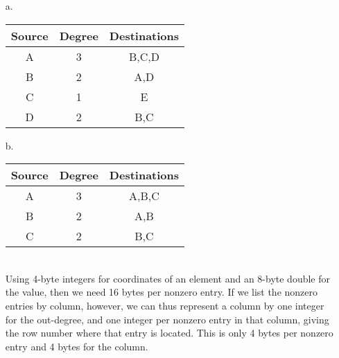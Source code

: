 \documentclass{article}
\begin{document}
\begin{itemize}
\begin{itemize}
			\begin{itemize}
				\item[a.]
					\begin{tabular}{c c c}
			 			\textbf{Source} & \textbf{Degree} & \textbf{Destinations}\\
						\hline
						A & 3 & B,C,D \\
						B & 2 & A,D \\
						C & 1 & E \\
						D & 2 & B,C \\
					\end{tabular}
				\item[b.]
					\begin{tabular}{c c c}
			 			\textbf{Source} & \textbf{Degree} & \textbf{Destinations}\\
						\hline
						A & 3 & A,B,C \\
						B & 2 & A,B \\
						C & 2 & B,C \\
					\end{tabular}\\
				Using 4-byte integers for coordinates of an element and an 8-byte double for the value, then we need 16 bytes per nonzero entry. If we list the nonzero entries by column, however, we can thus represent a column by one integer for the out-degree, and one integer per nonzero entry in that column, giving the row number where that entry is located. This is only 4 bytes per nonzero entry and 4 bytes for the column.
			\end{itemize}
	\end{itemize}


\end{itemize}
\end{document}
